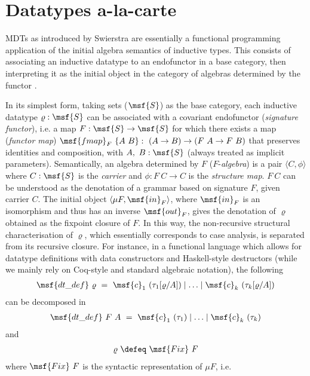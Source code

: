 \documentclass[submission,copyright,creativecommons]{eptcs}
\begin{document}
\section{Datatypes a-la-carte}  \label{section:zero}

MDTs as introduced by Swierstra \cite{Swier08} are essentially a
functional programming application of the initial algebra semantics of
inductive types. This consists of associating an inductive datatype to
an endofunctor in a base category, then interpreting it as the initial
object in the category of algebras determined by the functor
\cite{Hagino87,WadlerRecTypes}.

In its simplest form, taking sets ($\msf{S}$) as the base category,
each inductive datatype $\varrho : \msf{S}$ can be associated with a
covariant endofunctor (\emph{signature functor}), i.e. a map $F :
\msf{S} \to \msf{S}$ for which there exists a map (\emph{functor map})
$\msf{fmap}_F \ \{ A \ B \}: \ (A \to B) \to (F \ A \to F \ B)$ that
preserves identities and composition, with $A, \ B: \msf{S}$ (always
treated as implicit parameters). Semantically, an algebra determined
by $F$ ($F$-\emph{algebra}) is a pair $\langle C, \phi \rangle$ where
$C:\msf{S}$ is the \emph{carrier} and $\phi: F \ C \to C$ is the
\emph{structure map}. $F \ C$ can be understood as the denotation of a
grammar based on signature $F$, given carrier $C$. The initial object
$\langle \mu F, \msf{in}_F \rangle$, where $\msf{in}_F$ is an
isomorphism and thus has an inverse $\msf{out}_F$, gives the
denotation of $\varrho$ obtained as the fixpoint closure of $F$.
In this way, the non-recursive structural characterisation of
$\varrho$, which essentially corresponds to case analysis, is
separated from its recursive closure. For instance, in a functional
language which allows for datatype definitions with data constructors
and Haskell-style destructors (while we mainly rely on Coq-style and
standard algebraic notation), the following
\begin{gather} \label{data-rho}
 \msf{dt\_def} \ \varrho \ = \ \msf{c}_1 \ (\tau_1[\varrho/A]) \mid
\ldots \mid \msf{c}_k \ (\tau_k[\varrho/A]) 
\end{gather}
can be decomposed in
\begin{gather}
\msf{dt\_def} \ F \ A \ = \ \msf{c}_1 \ (\tau_1) \mid \ldots \mid
\msf{c}_k \ (\tau_k)
\end{gather}
and
\begin{gather}
 \varrho \ \defeq \ \msf{Fix} \ F 
\end{gather}
where $\msf{Fix} \ F$ is the syntactic representation of $\mu F$, i.e.
\end{document}

